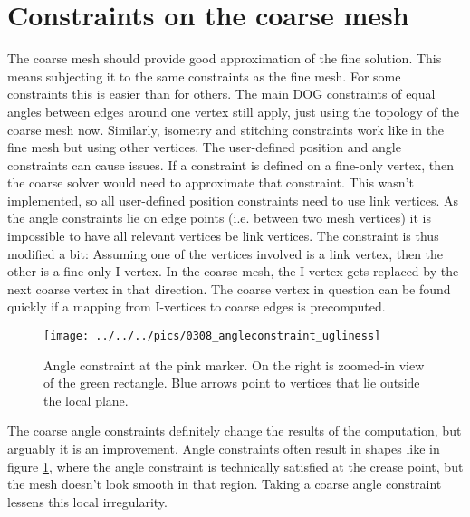 \documentclass[a4paper,twoside,12pt,nochapterprefix]{scrbook}
\begin{document}
\section{Constraints on the coarse mesh}\label{sec:coarse_constraints}
The coarse mesh should provide good approximation of the fine solution. This means subjecting it to the same constraints as the fine mesh. For some constraints this is easier than for others.\newline
The main DOG constraints of equal angles between edges around one vertex still apply, just using the topology of the coarse mesh now. Similarly, isometry and stitching constraints work like in the fine mesh but using other vertices.\newline
The user-defined position and angle constraints can cause issues. If a constraint is defined on a fine-only vertex, then the coarse solver would need to approximate that constraint. This wasn't implemented, so all user-defined position constraints need to use link vertices.\newline
As the angle constraints lie on edge points (i.e. between two mesh vertices) it is impossible to have all relevant vertices be link vertices. The constraint is thus modified a bit: Assuming one of the vertices involved is a link vertex, then the other is a fine-only I-vertex. In the coarse mesh, the I-vertex gets replaced by the next coarse vertex in that direction. The coarse vertex in question can be found quickly if a mapping from I-vertices to coarse edges is precomputed.\newline
\begin{figure}
    \centering
    \texttt{[image: ../../../pics/0308\_angleconstraint\_ugliness]}
    \caption{Angle constraint at the pink marker. On the right is zoomed-in view of the green rectangle. Blue arrows point to vertices that lie outside the local plane.}
      \label{fig:angleconstraint_ugliness}
\end{figure}
The coarse angle constraints definitely change the results of the computation, but arguably it is an improvement. Angle constraints often result in shapes like in figure \ref{fig:angleconstraint_ugliness}, where the angle constraint is technically satisfied at the crease point, but the mesh doesn't look smooth in that region. Taking a coarse angle constraint lessens this local irregularity.\newline
\end{document}
